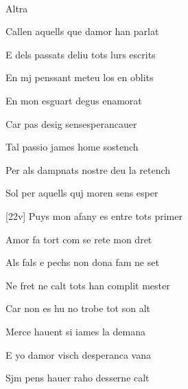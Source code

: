 \documentclass[12pt]{article}
\renewcommand{\espaiAbansEtiquetaPoema}{\vspace{0ex}}
\begin{document}
\begin{estrofa}

\espaiAbansEtiquetaPoema

\\

\begin{rubrica}

Altra

\end{rubrica}

\end{estrofa}


\begin{estrofa}

 Callen aquells que damor han parlat

 E dels passats deliu tots lurs escrits

 En mj penssant meteu los en oblits

 En mon esguart degus enamorat

 Car pas desig sensesperancauer

 Tal passio james home sostench

 Per als dampnats nostre deu la retench

 Sol per aquells quj moren sens esper

\end{estrofa}



\begin{estrofa}

 [22v] Puys mon afany es entre tots primer

 Amor fa tort com se rete mon dret

 Als fals e pechs non dona fam ne set

 Ne fret ne calt tots han complit mester

 Car non es hu no trobe tot son alt

 Merce hauent si iames la demana

 E yo damor visch desperanca vana

 Sjm pens hauer raho desserne calt

\end{estrofa}
\end{document}
